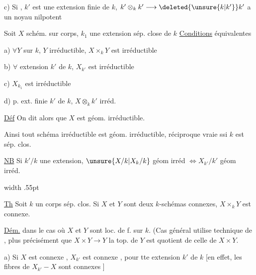 c) Si , $k'$ est une extension finie de $k$, $k'\otimes_k k'\longrightarrow\deleted{\unsure{k|k'}}k'$ a un noyau nilpotent


Soit $X$ schém. sur corps, $k_1$ une extension sép. close de $k$ \uline{Conditions} équivalentes

a) $\forall Y$ sur $k$, $Y$ irréductible, $X\times_k Y$ est irréductible

b) $\forall$ extension $k'$ de $k$, $X_{k'}$ est irréductible

c) $X_{k_1}$ est irréductible

d) p.  ext. finie  $k'$ de $k$, $X\otimes_k k'$ irréd.


\uline{Déf} On dit alors que $X$ est géom. irréductible.

Ainsi  tout schéma irréductible est géom. irréductible, réciproque vraie ssi $k$ est sép. clos.

\uline{NB} Si $k'/k$ une extension, $\unsure{X/k|X_k/k}$ géom irréd $\Longleftrightarrow X_{k'}/k'$ géom irréd. 

 

\noindent\vrule width .55pt\hspace{.5em}\begin{minipage}{.92\linewidth}
\uline{Th} Soit $k$ un corps sép. clos. Si $X$ et $Y$ sont deux $k$-schémas connexes, $X\times_k Y$ est connexe.

\end{minipage}\par
\uline{Dém.} dans le cas où $X$ et $Y$ sont loc. de  f. sur $k$. (Cas général utilise technique de , plus précisément que $X\times Y\longrightarrow Y$ la top. de $Y$ est quotient de celle de $X\times Y$.

a) Si $X$ est connexe , $X_{k'}$ est connexe , pour tte extension $k'$ de $k$ [en effet, les fibres de $X_{k'}-X$ sont connexes ]

